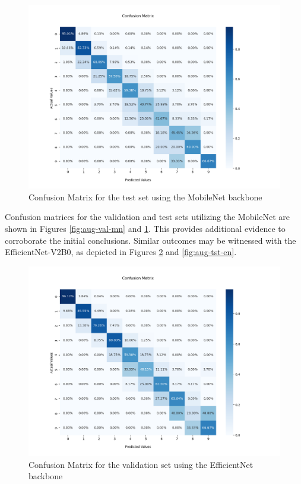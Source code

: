 \begin{figure}[h!]
    \centering
    \includegraphics[width = .9\linewidth]{Figures/data_aug_val_mn.png}
    \caption{Confusion Matrix for the test set using the MobileNet backbone}
    \label{fig:aug-tst-mn}
\end{figure}

Confusion matrices for the validation and test sets utilizing the MobileNet are shown in Figures \ref{fig:aug-val-mn} and \ref{fig:aug-tst-mn}. This provides additional evidence to corroborate the initial conclusions. Similar outcomes may be witnessed with the EfficientNet-V2B0, as depicted in Figures \ref{fig:aug-val-en} and \ref{fig:aug-tst-en}.

\begin{figure}[h!]
    \centering
    \includegraphics[width = .9\linewidth]{Figures/data_aug_val_en.png}
    \caption{Confusion Matrix for the validation set using the EfficientNet backbone}
    \label{fig:aug-val-en}
\end{figure}

